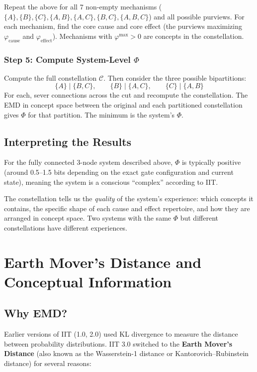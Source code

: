\documentclass[11pt,a4paper]{report}
\newcommand{\Phi}{\varPhi}
\newcommand{\phimax}{\varphi^{\mathrm{max}}}
\newcommand{\phicause}{\varphi_{\mathrm{cause}}}
\newcommand{\phieffect}{\varphi_{\mathrm{effect}}}
\begin{document}
Repeat the above for all 7 non-empty mechanisms ($\{A\}, \{B\}, \{C\}, \{A,B\}, \{A,C\}, \{B,C\}, \{A,B,C\}$) and all possible purviews. For each mechanism, find the core cause and core effect (the purviews maximizing $\phicause$ and $\phieffect$). Mechanisms with $\phimax > 0$ are concepts in the constellation.

\subsection{Step 5: Compute System-Level $\Phi$}

Compute the full constellation $\mathcal{C}$. Then consider the three possible bipartitions:
\[
  \{A\} \mid \{B,C\}, \qquad \{B\} \mid \{A,C\}, \qquad \{C\} \mid \{A,B\}
\]
For each, sever connections across the cut and recompute the constellation. The EMD in concept space between the original and each partitioned constellation gives $\Phi$ for that partition. The minimum is the system's $\Phi$.

\section{Interpreting the Results}

For the fully connected 3-node system described above, $\Phi$ is typically positive (around 0.5--1.5 bits depending on the exact gate configuration and current state), meaning the system is a conscious ``complex'' according to IIT.

The constellation tells us the \emph{quality} of the system's experience: which concepts it contains, the specific shape of each cause and effect repertoire, and how they are arranged in concept space. Two systems with the same $\Phi$ but different constellations have different experiences.


\chapter{Earth Mover's Distance and Conceptual Information}

\section{Why EMD?}

Earlier versions of IIT (1.0, 2.0) used KL divergence to measure the distance between probability distributions. IIT 3.0 switched to the \textbf{Earth Mover's Distance} (also known as the Wasserstein-1 distance or Kantorovich--Rubinstein distance) for several reasons:
\end{document}
